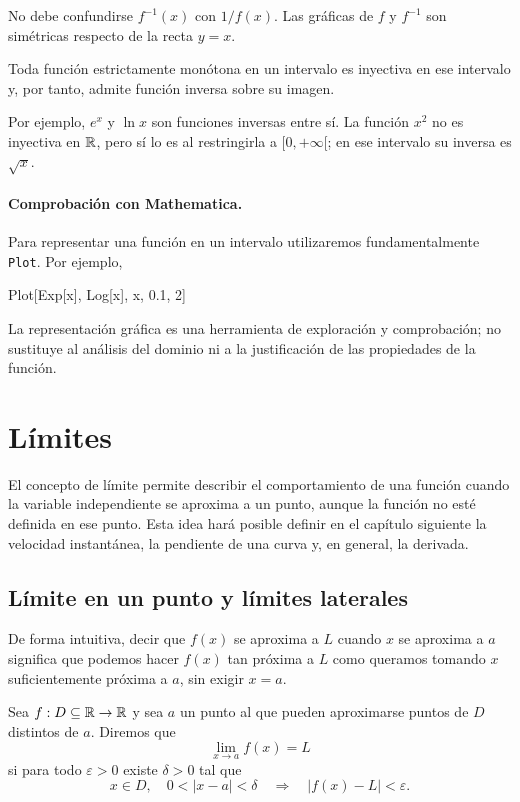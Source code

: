No debe confundirse $f^{-1}(x)$ con $1/f(x)$. Las gráficas de $f$ y $f^{-1}$ son simétricas respecto de la recta $y=x$.

\begin{proposition}
Toda función estrictamente monótona en un intervalo es inyectiva en ese intervalo y, por tanto, admite función inversa sobre su imagen.
\end{proposition}

Por ejemplo, $e^x$ y $\ln x$ son funciones inversas entre sí. La función $x^2$ no es inyectiva en $\mathbb{R}$, pero sí lo es al restringirla a $[0,+\infty[$; en ese intervalo su inversa es $\sqrt{x}$.

\paragraph{Comprobación con Mathematica.}
Para representar una función en un intervalo utilizaremos fundamentalmente \texttt{Plot}. Por ejemplo,
\begin{mathematicacode}
Plot[{Exp[x], Log[x]}, {x, 0.1, 2}]
\end{mathematicacode}
La representación gráfica es una herramienta de exploración y comprobación; no sustituye al análisis del dominio ni a la justificación de las propiedades de la función.

\section{Límites}
\label{sec:limites}

El concepto de límite permite describir el comportamiento de una función cuando la variable independiente se aproxima a un punto, aunque la función no esté definida en ese punto. Esta idea hará posible definir en el capítulo siguiente la velocidad instantánea, la pendiente de una curva y, en general, la derivada.

\subsection{Límite en un punto y límites laterales}

De forma intuitiva, decir que $f(x)$ se aproxima a $L$ cuando $x$ se aproxima a $a$ significa que podemos hacer $f(x)$ tan próxima a $L$ como queramos tomando $x$ suficientemente próxima a $a$, sin exigir $x=a$.

\begin{definition}
Sea $f:D\subseteq\mathbb{R}\to\mathbb{R}$ y sea $a$ un punto al que pueden aproximarse puntos de $D$ distintos de $a$. Diremos que
\[
\lim_{x\to a}f(x)=L
\]
si para todo $\varepsilon>0$ existe $\delta>0$ tal que
\[
x\in D,\quad 0<|x-a|<\delta
\quad\Longrightarrow\quad
|f(x)-L|<\varepsilon.
\]
\end{definition}

